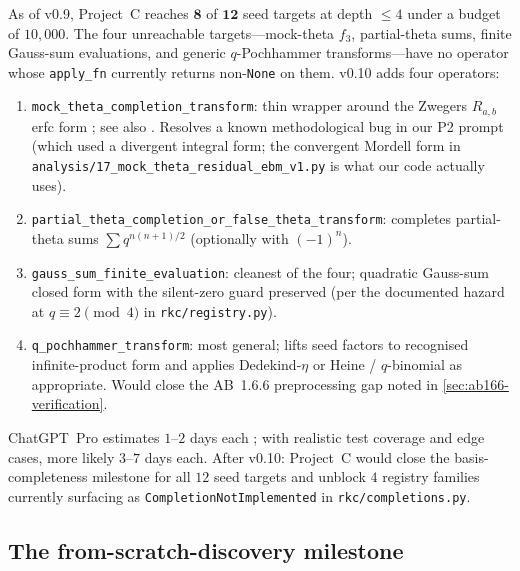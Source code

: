 \documentclass[11pt,reqno]{amsart}
\theoremstyle{definition}
\begin{document}
As of v0.9, Project~C reaches $\mathbf{8}$ of $\mathbf{12}$ seed
targets at depth $\le 4$ under a budget of $10{,}000$. The four
unreachable targets---mock-theta $f_3$, partial-theta sums, finite
Gauss-sum evaluations, and generic $q$-Pochhammer transforms---have
no operator whose \verb|apply_fn| currently returns non-\verb|None|
on them. v0.10 adds four operators:
\begin{enumerate}
\item \texttt{mock\_theta\_completion\_transform}: thin wrapper
  around the Zwegers $R_{a,b}$ erfc form
  \cite[diary~41]{ProjectC}; see also \cite{Zwegers2002}. Resolves
  a known methodological bug in our P2 prompt (which used a
  divergent integral form; the convergent Mordell form in
  \verb|analysis/17_mock_theta_residual_ebm_v1.py| is what our code
  actually uses).
\item \texttt{partial\_theta\_completion\_or\_false\_theta\_transform}:
  completes partial-theta sums $\sum q^{n(n+1)/2}$ (optionally with
  $(-1)^n$).
\item \texttt{gauss\_sum\_finite\_evaluation}: cleanest of the four;
  quadratic Gauss-sum closed form with the silent-zero guard
  preserved (per the documented hazard at $q \equiv 2 \pmod 4$ in
  \verb|rkc/registry.py|).
\item \texttt{q\_pochhammer\_transform}: most general; lifts seed
  factors to recognised infinite-product form and applies
  Dedekind-$\eta$ or Heine / $q$-binomial as appropriate. Would
  close the AB~1.6.6 preprocessing gap noted in
  \cref{sec:ab166-verification}.
\end{enumerate}

ChatGPT~Pro estimates $1$--$2$ days each
\cite[diary~42]{ProjectC}; with realistic test coverage and edge
cases, more likely $3$--$7$ days each. After v0.10: Project~C would
close the basis-completeness milestone for all $12$ seed targets and
unblock $4$ registry families currently surfacing as
\verb|CompletionNotImplemented| in \verb|rkc/completions.py|.

\subsection{The from-scratch-discovery milestone}
\end{document}
